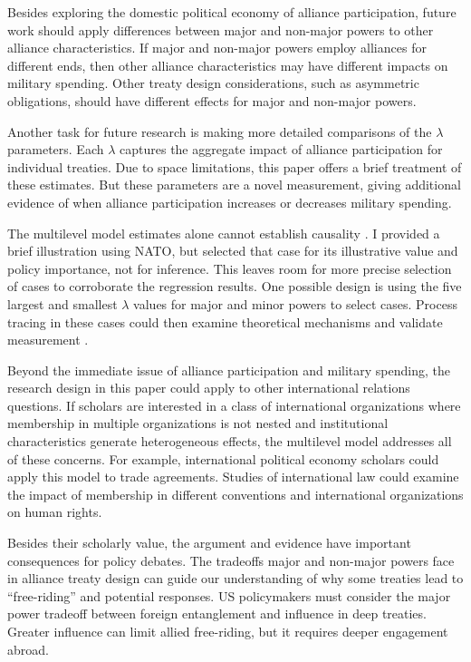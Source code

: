 \documentclass[12pt]{article}
\begin{document}
Besides exploring the domestic political economy of alliance participation, future work should apply differences between major and non-major powers to other alliance characteristics. 
If major and non-major powers employ alliances for different ends, then other alliance characteristics may have different impacts on military spending. 
Other treaty design considerations, such as asymmetric obligations, should have different effects for major and non-major powers. 


Another task for future research is making more detailed comparisons of the $\lambda$ parameters. 
Each $\lambda$ captures the aggregate impact of alliance participation for individual treaties.
Due to space limitations, this paper offers a brief treatment of these estimates. 
But these parameters are a novel measurement, giving additional evidence of when alliance participation increases or decreases military spending. 


The multilevel model estimates alone cannot establish causality \citep{Seawright2016}. 
I provided a brief illustration using NATO, but selected that case for its illustrative value and policy importance, not for inference. 
This leaves room for more precise selection of cases to corroborate the regression results. 
One possible design is using the five largest and smallest $\lambda$ values for major and minor powers to select cases. 
Process tracing in these cases could then examine theoretical mechanisms and validate measurement \citep{Seawright2016}. 


Beyond the immediate issue of alliance participation and military spending, the research design in this paper could apply to other international relations questions.
If scholars are interested in a class of international organizations where membership in multiple organizations is not nested and institutional characteristics generate heterogeneous effects, the multilevel model addresses all of these concerns.
For example, international political economy scholars could apply this model to trade agreements. 
Studies of international law could examine the impact of membership in different conventions and international organizations on human rights. 


Besides their scholarly value, the argument and evidence have important consequences for policy debates. 
The tradeoffs major and non-major powers face in alliance treaty design can guide our understanding of why some treaties lead to ``free-riding'' and potential responses. 
US policymakers must consider the major power tradeoff between foreign entanglement and influence in deep treaties. 
Greater influence can limit allied free-riding, but it requires deeper engagement abroad. 
\end{document}
